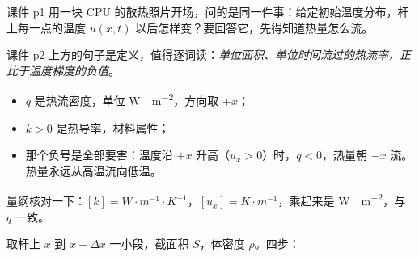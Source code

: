 \label{sec:72}


课件 p1 用一块 CPU 的散热照片开场，问的是同一件事：给定初始温度分布，杆上每一点的温度 $u(x,t)$ 以后怎样变？要回答它，先得知道热量怎么流。


课件 p2 上方的句子是定义，值得逐词读：\emph{单位面积、单位时间流过的热流率，正比于温度梯度的负值}。

\begin{itemize}
  \item $q$ 是热流密度，单位 \unit{W\cdot m^{-2}}，方向取 $+x$；
  \item $k>0$ 是热导率，材料属性；
  \item 那个负号是全部要害：温度沿 $+x$ 升高（$u_x>0$）时，$q<0$，热量朝 $-x$ 流。热量永远从高温流向低温。
\end{itemize}

量纲核对一下：$[k]=\unit{W\cdot m^{-1}\cdot K^{-1}}$，$[u_x]=\unit{K\cdot m^{-1}}$，乘起来是 \unit{W\cdot m^{-2}}，与 $q$ 一致。


取杆上 $x$ 到 $x+\Delta x$ 一小段，截面积 $S$，体密度 $\rho$。四步：

